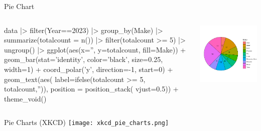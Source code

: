 \documentclass[ignorenonframetext,xcolor=x11names]{beamer}
\begin{document}
\begin{frame}[fragile]{Pie Chart}
\begin{columns}
\begin{column}{.55\textwidth}
\begin{Rcode}
data |>
  filter(Year==2023) |>
  group_by(Make) |>
  summarize(totalcount = n()) |>
  filter(totalcount >= 5) |>
  ungroup() |>
ggplot(aes(x='', y=totalcount, 
           fill=Make)) +
  geom_bar(stat='identity', 
           color='black', 
           size=0.25, width=1) + 
  coord_polar('y', 
              direction=-1, 
              start=0) +
  geom_text(aes(
    label=ifelse(totalcount >= 5,
                 totalcount,'')), 
    position = position_stack(
                 vjust=0.5)) +
  theme_void()
\end{Rcode}
\end{column}
\begin{column}{.55\textwidth}
  \includegraphics[width=\textwidth]{fuel.pie.pdf}
\end{column}
\end{columns}
\end{frame}


\begin{frame}{Pie Charts (XKCD)}
  \texttt{[image: xkcd\_pie\_charts.png]}
\end{frame}
\end{document}
